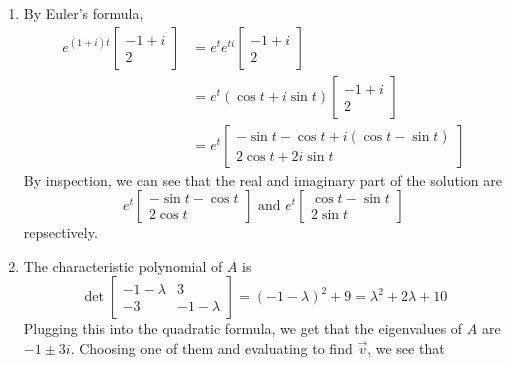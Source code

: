 \documentclass[12pt]{article}
\begin{document}
\begin{enumerate}
    \item By Euler's formula,
          \begin{align*}
              e^{(1+i)t}\begin{bmatrix}-1+i \\ 2\end{bmatrix} & = e^t e^{ti}\begin{bmatrix}-1+i \\ 2\end{bmatrix}              \\
                                                              & = e^t(\cos t + i \sin t) \begin{bmatrix}-1+i \\ 2\end{bmatrix} \\
                                                              & = e^t \begin{bmatrix}
                                                                          -\sin t - \cos t + i(\cos t - \sin t) \\
                                                                          2\cos t + 2i \sin t
                                                                      \end{bmatrix}
          \end{align*}
          By inspection, we can see that the real and imaginary part of the solution are
          \[e^t \begin{bmatrix}
                  -\sin t - \cos t \\ 2 \cos t
              \end{bmatrix} \text{ and } e^t \begin{bmatrix}
                  \cos t - \sin t \\ 2\sin t
              \end{bmatrix}\]
          repsectively.
    \item The characteristic polynomial of $A$ is
          \[\det \begin{bmatrix}
                  -1-\lambda & 3          \\
                  -3         & -1-\lambda
              \end{bmatrix}=(-1-\lambda)^2+9=\lambda^2+2\lambda+10\]
          Plugging this into the quadratic formula, we get that the eigenvalues of $A$ are $-1 \pm 3i$.
          Choosing one of them and evaluating to find $\vec{v}$, we see that

\end{enumerate}
\end{document}
